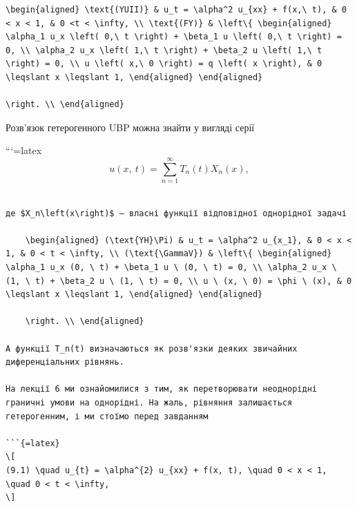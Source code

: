 \documentclass[
]{article}
\begin{document}
\begin{verbatim}
\begin{aligned} \text{(YUII)} & u_t = \alpha^2 u_{xx} + f(x,\ t), & 0 < x < 1, & 0 <t < \infty, \\ \text{(FY)} & \left\{ \begin{aligned} \alpha_1 u_x \left( 0,\ t \right) + \beta_1 u \left( 0,\ t \right) = 0, \\ \alpha_2 u_x \left( 1,\ t \right) + \beta_2 u \left( 1,\ t \right) = 0, \\ u \left( x,\ 0 \right) = q \left( x \right), & 0 \leqslant x \leqslant 1, \end{aligned} \end{aligned}

\right. \\ \end{aligned}
\end{verbatim}

Розв'язок гетерогенного UBP можна знайти у вигляді серії

```{=latex}
\[
u\left( x,\ t\right) =\sum_{n=1}^{\infty}T_{n}\left( t\right) X_{n}\left( x\right) ,
\]

\begin{verbatim}

де $X_n\left(x\right)$ — власні функції відповідної однорідної задачі

    \begin{aligned} (\text{YH}\Pi) & u_t = \alpha^2 u_{x_1}, & 0 < x < 1, & 0 < t < \infty, \\ (\text{\GammaV}) & \left\{ \begin{aligned} \alpha_1 u_x (0, \ t) + \beta_1 u \ (0, \ t) = 0, \\ \alpha_2 u_x \ (1, \ t) + \beta_2 u \ (1, \ t) = 0, \\ u \ (x, \ 0) = \phi \ (x), & 0 \leqslant x \leqslant 1, \end{aligned} \end{aligned}

    \right. \\ \end{aligned}

А функції T_n(t) визначаються як розв'язки деяких звичайних диференціальних рівнянь.

На лекції 6 ми ознайомилися з тим, як перетворювати неоднорідні граничні умови на однорідні. На жаль, рівняння залишається гетерогенним, і ми стоїмо перед завданням

```{=latex}
\[
(9.1) \quad u_{t} = \alpha^{2} u_{xx} + f(x, t), \quad 0 < x < 1, \quad 0 < t < \infty,
\]
\end{verbatim}
\end{document}
